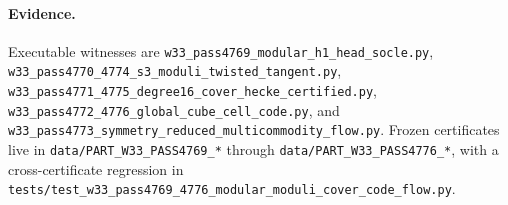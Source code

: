 \paragraph{Evidence.}
Executable witnesses are
\texttt{w33\_pass4769\_modular\_h1\_head\_socle.py},
\texttt{w33\_pass4770\_4774\_s3\_moduli\_twisted\_tangent.py},
\texttt{w33\_pass4771\_4775\_degree16\_cover\_hecke\_certified.py},
\texttt{w33\_pass4772\_4776\_global\_cube\_cell\_code.py}, and
\texttt{w33\_pass4773\_symmetry\_reduced\_multicommodity\_flow.py}.
Frozen certificates live in \texttt{data/PART\_W33\_PASS4769\_*} through
\texttt{data/PART\_W33\_PASS4776\_*}, with a cross-certificate regression in
\texttt{tests/test\_w33\_pass4769\_4776\_modular\_moduli\_cover\_code\_flow.py}.
